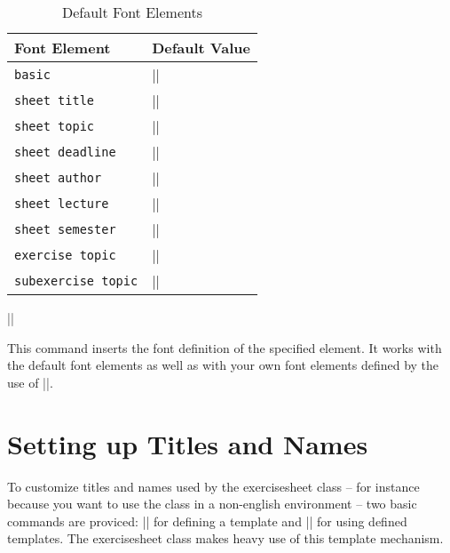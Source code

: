 \documentclass[a4paper,fleqn]{report}
\let\sffamily=\rmfamily
\def\sheettemplatekey#1{\lstinline[language={}]{#1}}
\def\exercisesheet{{exercisesheet}}
\def\syntaxdefaultarg#1{\hfill\texttt{\small #1}\par\smallskip\noindent\ignorespaces}
\def\metaargument#1{\textit{\small #1}}
\begin{document}
\begin{table}[htbp]
  \caption{Default Font Elements}
  \label{table:font elements}
  \bigskip
  \centering
  \begin{tabular}{ll}
    Font Element        & Default Value \\ \midrule
    \sheettemplatekey{basic}             & |\normalfont\rmfamily| \\
    \sheettemplatekey{sheet title}       & |\sffamily\fontsize{36}{40}\selectfont| \\
    \sheettemplatekey{sheet topic}       & |\sffamily\Huge| \\
    \sheettemplatekey{sheet deadline}    & |\sffamily\LARGE| \\
    \sheettemplatekey{sheet author}      & |\sffamily\small| \\
    \sheettemplatekey{sheet lecture}     & |\sffamily\scriptsize| \\
    \sheettemplatekey{sheet semester}    & |\sffamily\scriptsize| \\
    \sheettemplatekey{exercise topic}    & |\sffamily\small| \\
    \sheettemplatekey{subexercise topic} & |\sffamily\footnotesize|
  \end{tabular}
\end{table}

\begin{syntax}
  |\usesheetfont{|\metaargument{name of element}|}|
  \syntaxdefaultarg{}
  This command inserts the font definition of the specified element.
  It works with the default font elements as well as with your own
  font elements defined by the use of |\setsheetfont|.
\end{syntax}


\section{Setting up Titles and Names}

To customize titles and names used by the \exercisesheet{} class --
for instance because you want to use the class in a non-english
environment -- two basic commands are proviced: |\setsheettemplate|
for defining a template and |\usesheettemplate| for using defined
templates. The \exercisesheet{} class makes heavy use of this template
mechanism.
\end{document}
